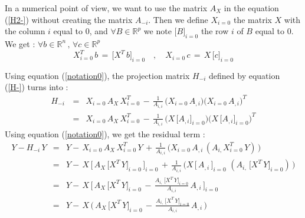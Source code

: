 In a numerical point of view, we want to use the matrix $A_X$ in the equation (\ref{H2-}) without creating the matrix $A_{-i }$.
Then we define $X_{i=0}$ the matrix $X$ with the column $i$ equal to $0$, and $\forall B \in \mathbb{R}^p$ we note $\big[B\big]_{i=0}$ the row $i$ of $B$ equal to $0$. 
We get : $\forall b \in \mathbb{R}^n\,,\, \forall c \in \mathbb{R}^p $
 \begin{equation}
\label{notation0}
X_{i=0}^T\,b \,=\,\big[X^T\,b\big]_{i=0} \quad,\quad X_{i=0}\,c \,=\,X\,\big[c\big]_{i=0}
 \end{equation}


 Using equation (\ref{notation0}), the projection matrix $H_{-i}$ defined by equation (\ref{H-}) turns into  :
 \begin{eqnarray}
H_{-i}\, & = & X_{i=0}\,A_X\,X_{i=0}^T \,-\,\frac {1}{A_{i,i}}\,  \big(X_{i=0}\,A_{,i}\big) \big(X_{i=0}\,A_{,i}\big)^T   \\
& = & X_{i=0}\,A_X\,X_{i=0}^T \,-\,\frac {1}{A_{i,i}}\,  \big(X\,\big[A_{,i}\big]_{i=0}  \big) \big(X\,\big[A_{,i}\big]_{i=0} \big)^T 
\end{eqnarray}
 Using equation (\ref{notation0}), we get the residual term : 
 \begin{eqnarray}
Y-H_{-i}\,Y & = &Y- \,X_{i=0}\,A_X\,X_{i=0}^T\,Y \,+\,\frac {1}{A_{i,i}}\,  \big(X_{i=0}\,A_{,i}\,(A_{i,} X_{i=0}^T\,Y)\,\big)   \\
 & = & Y-\,X\,\big[\,A_X\,\big[X^T\,Y\big]_{i=0}\,\big]_{i=0} \,+\,\frac {1}{A_{i,i}}\,  \big( X\,\big[\,A_{,i}\,\big]_{i=0}\,\,(A_{i,} \,\big[X^T\,Y\big]_{i=0})\,\big)   \\
 & = & Y-\,X\,\big[\,A_X\,\big[X^T\,Y\big]_{i=0}\, -\,\frac {A_{i,} \,\big[X^T\,Y\big]_{i=0}}{A_{i,i}}\,A_{,i}\,      \big]_{i=0} \\
\label{defH-Y}
 & = & Y- \,X\,\big(\,A_X\,\big[X^T\,Y\big]_{i=0}\, -\,\frac {A_{i,} \,\big[X^T\,Y\big]_{i=0}}{A_{i,i}}\,A_{,i}\,\big)
\end{eqnarray}


